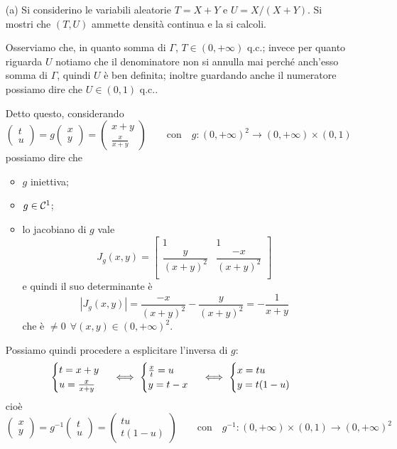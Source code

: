 \Soluzione{} %
\begin{enumerate}
\item [(a)] Si considerino le variabili aleatorie $T=X+Y$ e $U=X/(X+Y)$. Si mostri che $(T,U)$ ammette densità continua e la si calcoli.

Osserviamo che, in quanto somma di $\Gamma$, $T\in(0,+\infty)$ q.c.; invece per quanto riguarda $U$ notiamo che il denominatore non si annulla mai perché anch'esso somma di $\Gamma$, quindi $U$ è ben definita; inoltre guardando anche il numeratore possiamo dire che $U\in(0,1)$ q.c..

Detto questo, considerando
\[
\begin{pmatrix}
t \\ u
\end{pmatrix}=g\begin{pmatrix}
x \\ y
\end{pmatrix}=\begin{pmatrix}
x+y \\ \frac{x}{x+y}
\end{pmatrix}
\qquad\text{con}\quad g:(0,+\infty)^2\to(0,+\infty)\times (0,1)
\]
possiamo dire che
\begin{itemize}
\item $g$ iniettiva;
\item $g\in\mathcal{C}^1$;
\item lo jacobiano di $g$ vale
\[
J_g(x,y)=\begin{bmatrix}
 1& 1 \\
 \dfrac{y}{(x+y)^2}& \dfrac{-x}{(x+y)^2} \\
\end{bmatrix}
\]
e quindi il suo determinante è
\[
|J_g(x,y)|=\dfrac{-x}{(x+y)^2}-\dfrac{y}{(x+y)^2}=-\dfrac{1}{x+y}
\]
che è $\neq 0\ \ \forall(x,y)\in(0,+\infty)^2$.
\end{itemize}
Possiamo quindi procedere a esplicitare l'inversa di $g$:
\[
\begin{cases}t=x+y\\u=\frac{x}{x+y}\end{cases}
\ \Longleftrightarrow\ 
\begin{cases}\frac{x}{t}=u\\y=t-x\end{cases}
\ \Longleftrightarrow\ 
\begin{cases}x=tu\\y=t(1-u)\end{cases}
\]
cioè
\[
\begin{pmatrix}
x \\ y
\end{pmatrix}=g^{-1}\begin{pmatrix}
t \\ u
\end{pmatrix}=\begin{pmatrix}
tu \\ t(1-u)
\end{pmatrix}
\qquad\text{con}\quad g^{-1}:(0,+\infty)\times (0,1)\to(0,+\infty)^2
\]


\end{enumerate}
